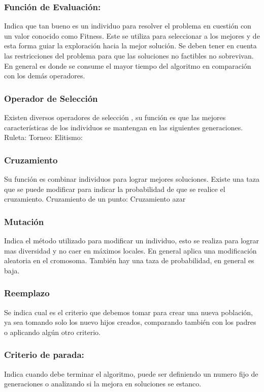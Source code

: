 \subsubsection{Función de Evaluación:} 
Indica que tan bueno es un individuo para resolver el problema en cuestión con un valor conocido como Fitness. Este se utiliza para seleccionar a los mejores y de esta forma guiar la exploración hacia la mejor solución.
Se deben tener en cuenta las restricciones del problema para que las soluciones no factibles no sobrevivan.
En general es donde se consume el mayor tiempo del algoritmo en comparación con los demás operadores.

\subsubsection{Operador de Selección}
Existen diversos operadores de selección , su función es que las mejores características de los individuos se mantengan en las siguientes generaciones.
Ruleta:
Torneo:
Elitismo:

\subsubsection{Cruzamiento}
Su función es combinar individuos para lograr mejores soluciones. 
Existe una taza que se puede modificar para indicar la probabilidad de que se realice el cruzamiento.
Cruzamiento de un punto:
Cruzamiento azar

\subsubsection{Mutación} 
Indica el método utilizado para modificar un individuo, esto se realiza para lograr mas diversidad y no caer en máximos locales. En general aplica una modificación aleatoria en el cromosoma.
También hay una taza de probabilidad, en general es baja.

\subsubsection{Reemplazo} 
Se indica cual es el criterio que debemos tomar para crear una nueva población, ya sea tomando solo los nuevo hijos creados, comparando también con los padres o aplicando algún otro criterio.

\subsubsection{Criterio de parada:} 
Indica cuando debe terminar el algoritmo, puede ser definiendo un numero fijo de generaciones o analizando si la mejora en soluciones se estanco.

